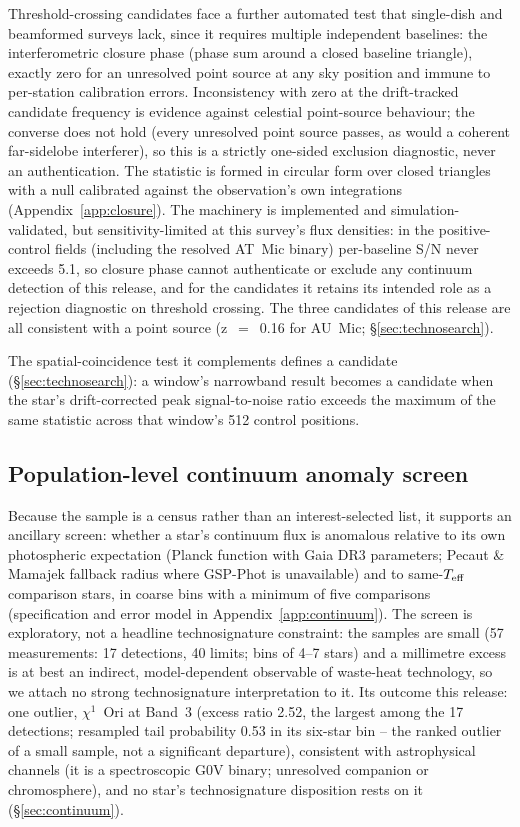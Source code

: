 \documentclass{openjournal}
\begin{document}
Threshold-crossing candidates face a further automated test that
single-dish and beamformed surveys lack, since it requires multiple
independent baselines: the interferometric closure phase (phase sum
around a closed baseline triangle), exactly zero for an unresolved
point source at any sky position and immune to per-station
calibration errors. Inconsistency with zero at the drift-tracked
candidate frequency is evidence against celestial point-source
behaviour; the converse does not hold (every unresolved point source
passes, as would a coherent far-sidelobe interferer), so this is a
strictly one-sided exclusion diagnostic, never an authentication. The
statistic is formed in circular form over closed triangles with a
null calibrated against the observation's own integrations
(Appendix~\ref{app:closure}). The machinery is implemented and
simulation-validated, but sensitivity-limited at this survey's flux
densities: in the positive-control fields (including the resolved
AT~Mic binary) per-baseline S/N never exceeds 5.1, so closure phase
cannot authenticate or exclude any continuum detection of this
release, and for the candidates it retains its intended role as a
rejection diagnostic on threshold crossing. The three candidates of
this release are all consistent with a point source (z~$=$~0.16 for
AU~Mic; \S\ref{sec:technosearch}).

The spatial-coincidence test it complements defines a candidate
(\S\ref{sec:technosearch}): a window's narrowband result becomes a
candidate when the star's drift-corrected peak signal-to-noise ratio
exceeds the maximum of the same statistic across that window's 512
control positions.

\subsection{Population-level continuum anomaly screen}
\label{sec:popanomaly}

Because the sample is a census rather than an interest-selected list,
it supports an ancillary screen: whether a star's continuum flux is
anomalous relative to its own photospheric expectation (Planck
function with Gaia DR3 parameters; Pecaut \& Mamajek fallback radius
where GSP-Phot is unavailable) and to same-$T_{\rm eff}$ comparison
stars, in coarse bins with a minimum of five comparisons
(specification and error model in Appendix~\ref{app:continuum}). The
screen is exploratory, not a headline technosignature constraint: the
samples are small (57 measurements: 17 detections, 40 limits; bins of
4--7 stars) and a millimetre excess is at best an indirect,
model-dependent observable of waste-heat technology, so we attach no
strong technosignature interpretation to it. Its outcome this
release: one outlier, $\chi^1$~Ori at Band~3 (excess ratio 2.52, the
largest among the 17 detections; resampled tail probability 0.53 in
its six-star bin -- the ranked outlier of a small sample, not a
significant departure), consistent with astrophysical channels (it is
a spectroscopic G0V binary; unresolved companion or chromosphere),
and no star's technosignature disposition rests on it
(\S\ref{sec:continuum}).
\end{document}
